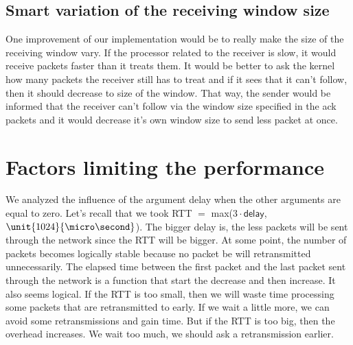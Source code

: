 \documentclass[11pt,a4paper]{article}
\begin{document}
\subsection{Smart variation of the receiving window size}
One improvement of our implementation would be to really make the size of the receiving window vary. If the processor related to the receiver is slow, it would receive packets faster than it treats them. It would be better to ask the kernel how many packets the receiver still has to treat and if it sees that it can't follow, then it should decrease to size of the window. That way, the sender would be informed that the receiver can't follow via the window size specified in the ack packets and it would decrease it's own window size to send less packet at once.

\section{Factors limiting the performance}

We analyzed the influence of the argument delay when the other arguments are equal to zero. Let's recall that we took RTT $=$ max($3 \cdot \mathsf{delay}$, $\unit{1024}{\micro\second}$).  The bigger delay is, the less packets will be sent through the network since the RTT will be bigger. At some point, the number of packets becomes logically stable because no packet be will retransmitted unnecessarily. The elapsed time between the first packet and the last packet sent through the network is a function that start the decrease and then increase. It also seems logical. If the RTT is too small, then we will waste time processing some packets that are retransmitted to early. If we wait a little more, we can avoid some retransmissions and gain time. But if the RTT is too big, then the overhead increases. We wait too much, we should ask a retransmission earlier.
\end{document}
